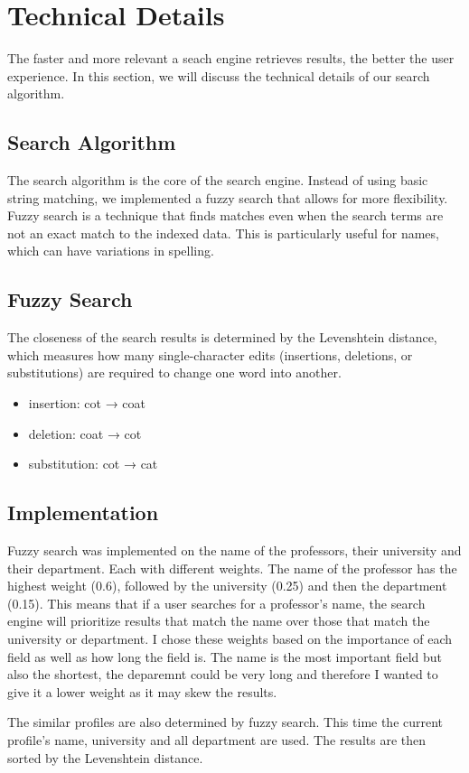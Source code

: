 \section{Technical Details}

The faster and more relevant a seach engine retrieves results, the better the user experience. In this section, we will discuss the technical details of our search algorithm.

\subsection{Search Algorithm}

The search algorithm is the core of the search engine. Instead of using basic string matching, we implemented a fuzzy search that allows for more flexibility. Fuzzy search is a technique that finds matches even when the search terms are not an exact match to the indexed data. This is particularly useful for names, which can have variations in spelling.

\subsection{Fuzzy Search}

The closeness of the search results is determined by the Levenshtein distance, which measures how many single-character edits (insertions, deletions, or substitutions) are required to change one word into another.
\begin{itemize}
    \item insertion: cot → coat
    \item deletion: coat → cot
    \item substitution: cot → cat
\end{itemize}

\subsection{Implementation}

Fuzzy search was implemented on the name of the professors, their university and their department. Each with different weights. The name of the professor has the highest weight (0.6), followed by the university (0.25) and then the department (0.15). This means that if a user searches for a professor's name, the search engine will prioritize results that match the name over those that match the university or department. I chose these weights based on the importance of each field as well as how long the field is. The name is the most important field but also the shortest, the deparemnt could be very long and therefore I wanted to give it a lower weight as it may skew the results.

The similar profiles are also determined by fuzzy search. This time the current profile's name, university and all department are used. The results are then sorted by the Levenshtein distance.